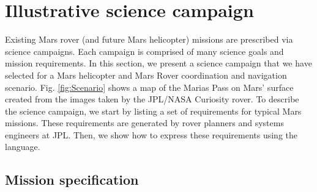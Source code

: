 \documentclass[conference]{IEEEtran}
\begin{document}
	
	\section{Illustrative science campaign}
		\label{sec:misspec}
	Existing Mars rover (and future Mars helicopter) missions are prescribed via science campaigns. Each campaign is comprised of many science goals and mission requirements. In this section, we present a science campaign that we have selected for a Mars helicopter and Mars Rover coordination and navigation scenario. Fig. \ref{fig:Scenario} shows a map of the Marias Pass on Mars' surface created from the images taken by the JPL/NASA Curiosity rover. To describe the science campaign, we start by listing a set of requirements for typical Mars missions. These requirements are generated by rover planners and systems engineers at JPL. Then, we show how to express these requirements using the \DTL language.
    
	\subsection{Mission specification}
\end{document}
